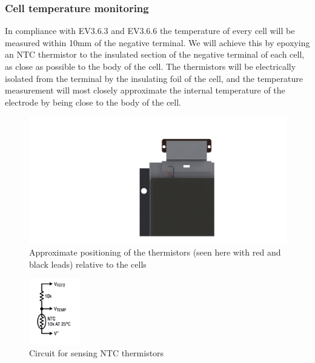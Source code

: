 \documentclass{article}
\begin{document}
\subsubsection{Cell temperature monitoring}\label{accumulator_cell_temperature_monitoring}

In compliance with EV3.6.3 and EV3.6.6 the temperature of every cell will be measured within 10mm of the negative terminal. We will achieve this by epoxying an NTC thermistor to the insulated section of the negative terminal of each cell, as close as possible to the body of the cell. The thermistors will be electrically isolated from the terminal by the insulating foil of the cell, and the temperature measurement will most closely approximate the internal temperature of the electrode by being close to the body of the cell. 

\begin{figure}[H]
    \centering
    \includegraphics[width=1\textwidth]{thermistor}
    \caption{Approximate positioning of the thermistors (seen here with red and black leads) relative to the cells}
    \label{fig:cell_temp_monitor}
\end{figure}

\begin{figure}[H]
    \centering
    \includegraphics[width=0.2\textwidth]{therm_circuit}
    \caption{Circuit for sensing NTC thermistors}
    \label{fig:therm_circuit}
\end{figure}
\end{document}
